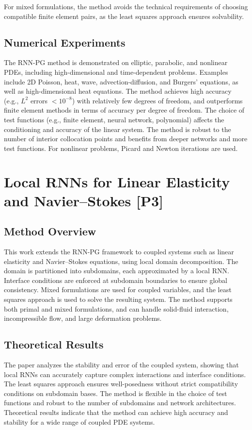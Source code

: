 \documentclass[12pt]{article}
\begin{document}
For mixed formulations, the method avoids the technical requirements of choosing compatible finite element pairs, as the least squares approach ensures solvability.

\subsection{Numerical Experiments}
The RNN-PG method is demonstrated on elliptic, parabolic, and nonlinear PDEs, including high-dimensional and time-dependent problems. Examples include 2D Poisson, heat, wave, advection-diffusion, and Burgers' equations, as well as high-dimensional heat equations. The method achieves high accuracy (e.g., $L^2$ errors $<10^{-8}$) with relatively few degrees of freedom, and outperforms finite element methods in terms of accuracy per degree of freedom. The choice of test functions (e.g., finite element, neural network, polynomial) affects the conditioning and accuracy of the linear system. The method is robust to the number of interior collocation points and benefits from deeper networks and more test functions. For nonlinear problems, Picard and Newton iterations are used.

\section{Local RNNs for Linear Elasticity and Navier–Stokes [P3]}
\subsection{Method Overview}
This work extends the RNN-PG framework to coupled systems such as linear elasticity and Navier–Stokes equations, using local domain decomposition. The domain is partitioned into subdomains, each approximated by a local RNN. Interface conditions are enforced at subdomain boundaries to ensure global consistency. Mixed formulations are used for coupled variables, and the least squares approach is used to solve the resulting system. The method supports both primal and mixed formulations, and can handle solid-fluid interaction, incompressible flow, and large deformation problems.

\subsection{Theoretical Results}
The paper analyzes the stability and error of the coupled system, showing that local RNNs can accurately capture complex interactions and interface conditions. The least squares approach ensures well-posedness without strict compatibility conditions on subdomain bases. The method is flexible in the choice of test functions and robust to the number of subdomains and network architectures. Theoretical results indicate that the method can achieve high accuracy and stability for a wide range of coupled PDE systems.
\end{document}
